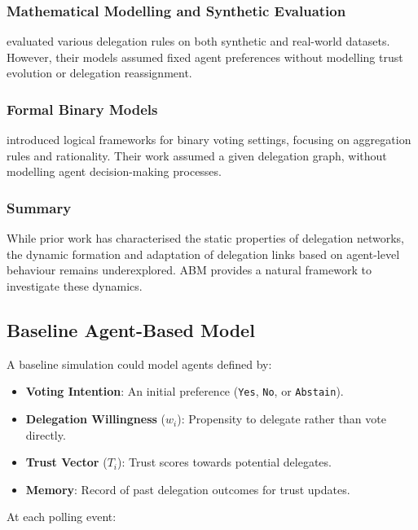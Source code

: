 \subsubsection{Mathematical Modelling and Synthetic Evaluation}

\citet{brill_liquid_2022} evaluated various delegation rules on both synthetic and real-world datasets. However, their models assumed fixed agent preferences without modelling trust evolution or delegation reassignment.

\subsubsection{Formal Binary Models}

\citet{christoffBinaryVotingDelegable2017} introduced logical frameworks for binary voting settings, focusing on aggregation rules and rationality. Their work assumed a given delegation graph, without modelling agent decision-making processes.

\subsubsection{Summary}

While prior work has characterised the static properties of delegation networks, the dynamic formation and adaptation of delegation links based on agent-level behaviour remains underexplored. ABM provides a natural framework to investigate these dynamics.

\subsection{Baseline Agent-Based Model}

A baseline simulation could model agents defined by:

\begin{itemize}
    \item \textbf{Voting Intention}: An initial preference (\texttt{Yes}, \texttt{No}, or \texttt{Abstain}).
    \item \textbf{Delegation Willingness} ($w_i$): Propensity to delegate rather than vote directly.
    \item \textbf{Trust Vector} ($T_i$): Trust scores towards potential delegates.
    \item \textbf{Memory}: Record of past delegation outcomes for trust updates.
\end{itemize}

At each polling event:

